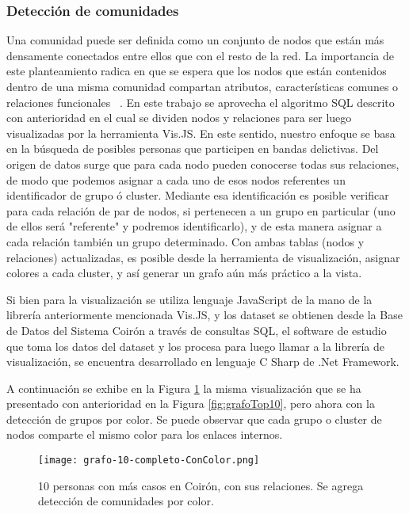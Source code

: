 \subsubsection{Detección de comunidades}
Una comunidad puede ser definida como un conjunto de nodos que están más densamente conectados entre ellos que con el resto de la red. La importancia de este planteamiento radica en que se espera que los nodos que están contenidos dentro de una misma comunidad compartan atributos, características comunes o relaciones funcionales  ~\cite{ma2014exploring}.
En este trabajo se aprovecha el algoritmo SQL descrito con anterioridad en el cual se dividen nodos y relaciones para ser luego visualizadas por la herramienta Vis.JS.
En este sentido, nuestro enfoque se basa en la búsqueda de posibles personas que participen en bandas delictivas. Del origen de datos surge que para cada nodo pueden conocerse todas sus relaciones, de modo que podemos asignar a cada uno de esos nodos referentes un identificador de grupo ó cluster. Mediante esa identificación es posible verificar para cada relación de par de nodos, si pertenecen a un grupo en particular (uno de ellos será "referente" y podremos identificarlo), y de esta manera asignar a cada relación también un grupo determinado. Con ambas tablas (nodos y relaciones) actualizadas, es posible desde la herramienta de visualización, asignar colores a cada cluster, y así generar un grafo aún más práctico a la vista.

Si bien para la visualización se utiliza lenguaje JavaScript de la mano de la librería anteriormente mencionada Vis.JS, y los dataset se obtienen desde la Base de Datos del Sistema Coirón a través de consultas SQL, el software de estudio que toma los datos del dataset y los procesa para luego llamar a la librería de visualización, se encuentra desarrollado en lenguaje C Sharp de .Net Framework. 

A continuación se exhibe en la Figura \ref{fig:grafo-10-completo-ConColor} la misma visualización que se ha presentado con anterioridad en la Figura \ref{fig:grafoTop10}, pero ahora con la detección de grupos por color. Se puede observar que cada grupo o cluster de nodos comparte el mismo color para los enlaces internos. 

\begin{figure}
	\centering
	\texttt{[image: grafo-10-completo-ConColor.png]}
	\caption{10 personas con más casos en Coirón, con sus relaciones. Se agrega detección de comunidades por color.} 
	\label{fig:grafo-10-completo-ConColor}
\end{figure}
